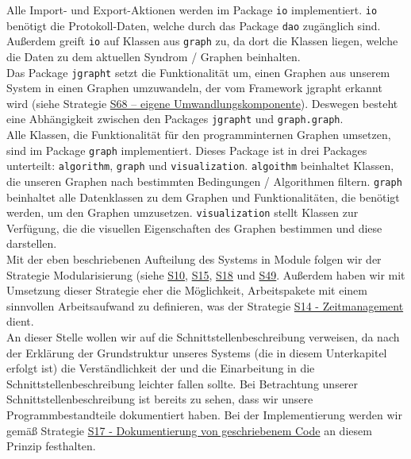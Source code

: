 \documentclass[enabledeprecatedfontcommands,fontsize=11pt,paper=a4,twoside]{scrartcl}
\newcounter{one}
\begin{document}
Alle Import- und Export-Aktionen werden im Package \texttt{io} implementiert. \texttt{io} benötigt die Protokoll-Daten, welche durch das Package \texttt{dao} zugänglich sind. Außerdem greift \texttt{io} auf Klassen aus \texttt{graph} zu, da dort die Klassen liegen, welche die Daten zu dem aktuellen Syndrom / Graphen beinhalten. \\

Das Package \texttt{jgrapht} setzt die Funktionalität um, einen Graphen aus unserem System in einen Graphen umzuwandeln, der vom Framework jgrapht erkannt wird (siehe Strategie \hyperlink{umwandlungskomponente}{S68 – eigene Umwandlungskomponente}). Deswegen besteht eine Abhängigkeit zwischen den Packages \texttt{jgrapht} und \texttt{graph.graph}. \\

Alle Klassen, die Funktionalität für den programminternen Graphen umsetzen, sind im Package \texttt{graph} implementiert. Dieses Package ist in drei Packages unterteilt: \texttt{algorithm}, \texttt{graph} und \texttt{visualization}. \texttt{algoithm} beinhaltet Klassen, die unseren Graphen nach bestimmten Bedingungen / Algorithmen filtern. \texttt{graph} beinhaltet alle Datenklassen zu dem Graphen und Funktionalitäten, die benötigt werden, um den Graphen umzusetzen. \texttt{visualization} stellt Klassen zur Verfügung, die die visuellen Eigenschaften des Graphen bestimmen und diese darstellen. \\

Mit der eben beschriebenen Aufteilung des Systems in Module folgen wir der Strategie Modularisierung (siehe \hyperlink{aadd}{S10}, \hyperlink{aabb}{S15}, \hyperlink{aacc}{S18} und \hyperlink{aaaa}{S49}. Außerdem haben wir mit Umsetzung dieser Strategie eher die Möglichkeit, Arbeitspakete mit einem sinnvollen Arbeitsaufwand zu definieren, was der Strategie \hyperlink{zeitmanagement}{S14 - Zeitmanagement} dient. \\

An dieser Stelle wollen wir auf die Schnittstellenbeschreibung verweisen, da nach der Erklärung der Grundstruktur unseres Systems (die in diesem Unterkapitel erfolgt ist) die Verständlichkeit der und die Einarbeitung in die Schnittstellenbeschreibung leichter fallen sollte. Bei Betrachtung unserer Schnittstellenbeschreibung ist bereits zu sehen, dass wir unsere Programmbestandteile dokumentiert haben. Bei der Implementierung werden wir gemäß Strategie \hyperlink{aaad}{S17 - Dokumentierung von geschriebenem Code} an diesem Prinzip festhalten. \\
\end{document}
